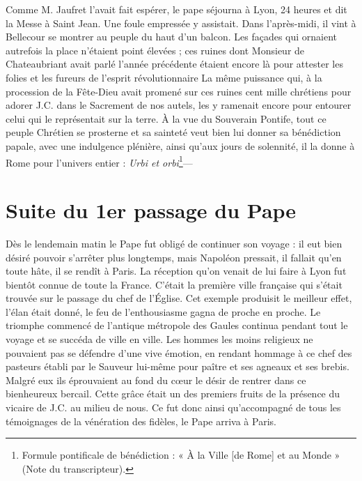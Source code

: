 \documentclass[11pt,a4paper]{report}
\begin{document}
Comme M. Jaufret l'avait fait espérer, le pape séjourna à Lyon, 24 heures et dit la Messe à Saint Jean. Une foule empressée y assistait. Dans l'après-midi, il vint à Bellecour se montrer au peuple du haut d'un balcon. Les façades qui ornaient autrefois la place n'étaient point élevées ; ces ruines dont Monsieur de Chateaubriant avait parlé l'année précédente étaient encore là pour attester les folies et les fureurs de l'esprit révolutionnaire La même puissance qui, à la procession de la Fête-Dieu avait promené sur ces ruines cent mille chrétiens pour adorer J.C. dans le Sacrement de nos autels, les y ramenait encore pour entourer celui qui le représentait sur la terre. À la vue du Souverain Pontife, tout ce peuple Chrétien se prosterne et sa sainteté veut bien lui donner sa bénédiction papale, avec une indulgence plénière, ainsi qu'aux jours de solennité, il la donne à Rome pour l'univers entier : \textit{Urbi et orbi}\footnote{Formule pontificale de bénédiction : « À la Ville [de Rome] et au Monde » (Note du transcripteur).}---

\section*{Suite du 1er passage du Pape}

Dès le lendemain matin le Pape fut obligé de continuer son voyage : il eut bien désiré pouvoir s'arrêter plus longtemps, mais Napoléon pressait, il fallait qu'en toute hâte, il se rendît à Paris. La réception qu'on venait de lui faire à Lyon fut bientôt connue de toute la France. C'était la première ville française qui s'était trouvée sur le passage du chef de l'Église. Cet exemple produisit le meilleur effet, l'élan était donné, le feu de l'enthousiasme gagna de proche en proche. Le triomphe commencé de l'antique métropole des Gaules continua pendant tout le voyage et se succéda de ville en ville. Les hommes les moins religieux ne pouvaient pas se défendre d'une vive émotion, en rendant hommage à ce chef des pasteurs établi par le Sauveur lui-même pour paître et ses agneaux et ses brebis. Malgré eux ils éprouvaient au fond du cœur le désir de rentrer dans ce bienheureux bercail. Cette grâce était un des premiers fruits de la présence du vicaire de J.C. au milieu de nous. Ce fut donc ainsi qu'accompagné de tous les témoignages de la vénération des fidèles, le Pape arriva à Paris.
\end{document}
